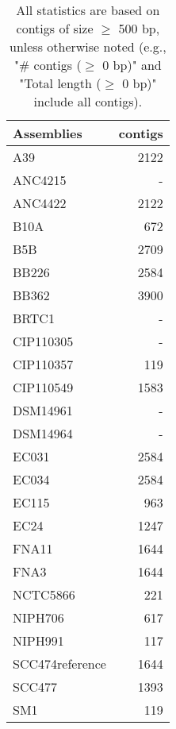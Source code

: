 \documentclass[12pt,a4paper]{article}
\begin{document}
\begin{table}[ht]
\begin{center}
\caption{All statistics are based on contigs of size $\geq$ 500 bp, unless otherwise noted (e.g., "\# contigs ($\geq$ 0 bp)" and "Total length ($\geq$ 0 bp)" include all contigs).}
\begin{tabular}{|l*{1}{|r}|}
\hline
Assemblies & contigs \\ \hline
A39 & 2122 \\ \hline
ANC4215 & - \\ \hline
ANC4422 & 2122 \\ \hline
B10A & 672 \\ \hline
B5B & 2709 \\ \hline
BB226 & 2584 \\ \hline
BB362 & 3900 \\ \hline
BRTC1 & - \\ \hline
CIP110305 & - \\ \hline
CIP110357 & 119 \\ \hline
CIP110549 & 1583 \\ \hline
DSM14961 & - \\ \hline
DSM14964 & - \\ \hline
EC031 & 2584 \\ \hline
EC034 & 2584 \\ \hline
EC115 & 963 \\ \hline
EC24 & 1247 \\ \hline
FNA11 & 1644 \\ \hline
FNA3 & 1644 \\ \hline
NCTC5866 & 221 \\ \hline
NIPH706 & 617 \\ \hline
NIPH991 & 117 \\ \hline
SCC474reference & 1644 \\ \hline
SCC477 & 1393 \\ \hline
SM1 & 119 \\ \hline
\end{tabular}
\end{center}
\end{table}
\end{document}
